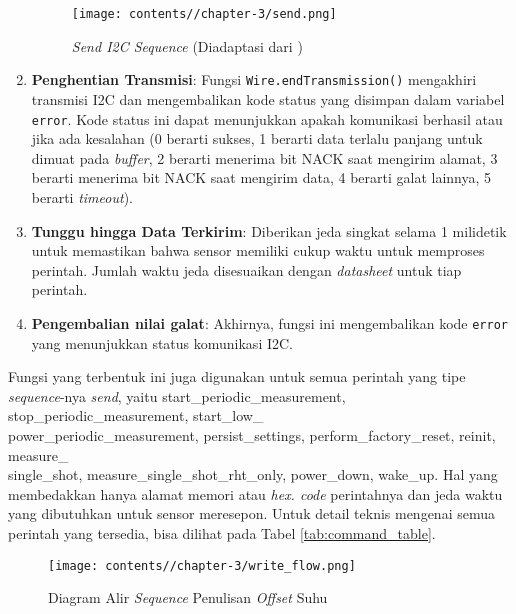\begin{enumerate}
            \begin{figure}[ht]
                \centering
                \texttt{[image: contents//chapter-3/send.png]}
                \caption{\textit{Send I2C Sequence} (Diadaptasi dari \cite{scd4x_datasheet})}
                \label{fig:send}
            \end{figure}
            
            \item \textbf{Penghentian Transmisi}: Fungsi \texttt{Wire.endTransmission()} mengakhiri transmisi I2C dan mengembalikan kode status yang disimpan dalam variabel \texttt{error}. Kode status ini dapat menunjukkan apakah komunikasi berhasil atau jika ada kesalahan (0 berarti sukses, 1 berarti data terlalu panjang untuk dimuat pada \textit{buffer}, 2 berarti menerima bit NACK saat mengirim alamat, 3 berarti menerima bit NACK saat mengirim data, 4 berarti galat lainnya, 5 berarti \textit{timeout}).

            \item \textbf{Tunggu hingga Data Terkirim}: Diberikan jeda singkat selama 1 milidetik untuk memastikan bahwa sensor memiliki cukup waktu untuk memproses perintah. Jumlah waktu jeda disesuaikan dengan \textit{datasheet} untuk tiap perintah. 
            
            \item \textbf{Pengembalian nilai galat}: Akhirnya, fungsi ini mengembalikan kode \texttt{error} yang menunjukkan status komunikasi I2C.

        \end{enumerate}

        Fungsi yang terbentuk ini juga digunakan untuk semua perintah yang tipe \textit{sequence}-nya \textit{send}, yaitu start\_periodic\_measurement, stop\_periodic\_measurement, start\_low\_\\power\_periodic\_measurement, persist\_settings, perform\_factory\_reset, reinit, measure\_\\single\_shot, measure\_single\_shot\_rht\_only, power\_down, wake\_up. Hal yang membedakkan hanya alamat memori atau \textit{hex. code} perintahnya dan jeda waktu yang dibutuhkan untuk sensor meresepon. Untuk detail teknis mengenai semua perintah yang tersedia, bisa dilihat pada Tabel \ref{tab:command_table}.

        \begin{figure}[H]
            \centering
            \texttt{[image: contents//chapter-3/write\_flow.png]}
            \caption{Diagram Alir \textit{Sequence} Penulisan \textit{Offset} Suhu}
            \label{fig:write_flow}
        \end{figure}
        

